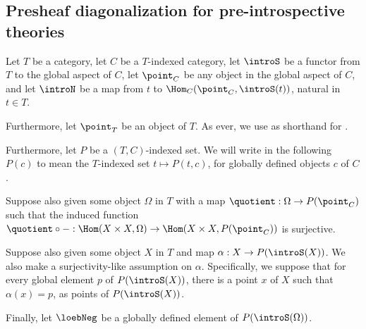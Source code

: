 \subsection{Presheaf diagonalization for pre-introspective theories}
\label{PreIntrospDiag}
Let $T$ be a category, let $C$ be a $T$-indexed category, let $\introS$ be a functor from $T$ to the global aspect of $C$, let $\point_C$ be any object in the global aspect of $C$, and let $\introN$ be a map from $t$ to $\Hom_C(\point_C, \introS(t))$, natural in $t \in T$.

Furthermore, let $\point_T$ be an object of $T$. As ever, we use  as shorthand for .

Furthermore, let $P$ be a $(T, C)$-indexed set. We will write in the following $P(c)$ to mean the $T$-indexed set $t \mapsto P(t, c)$, for globally defined objects $c$ of $C$.

Suppose also given some object $\Omega$ in $T$ with a map $\quotient : \Omega \to P(\point_C)$ such that the induced function $\quotient \circ - : \Hom(X \times X, \Omega) \to \Hom(X \times X, P(\point_C))$ is surjective.

Suppose also given some object $X$ in $T$ and map $\alpha : X \to P(\introS(X))$. We also make a surjectivity-like assumption on $\alpha$. Specifically, we suppose that for every global element $p$ of $P(\introS(X))$, there is a point $x$ of $X$ such that $\alpha(x) = p$, as points of $P(\introS(X))$.

Finally, let $\loebNeg$ be a globally defined element of $P(\introS(\Omega))$.

